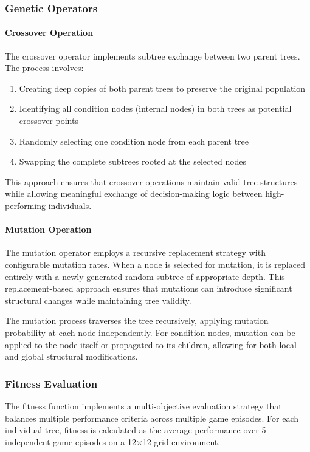 \documentclass[a4paper,12pt]{article}
\begin{document}
\subsubsection{Genetic Operators}

\paragraph{Crossover Operation} The crossover operator implements subtree exchange between two parent trees. The process involves:
\begin{enumerate}
   \item Creating deep copies of both parent trees to preserve the original population
   \item Identifying all condition nodes (internal nodes) in both trees as potential crossover points
   \item Randomly selecting one condition node from each parent tree
   \item Swapping the complete subtrees rooted at the selected nodes
\end{enumerate}

This approach ensures that crossover operations maintain valid tree structures while allowing meaningful exchange of decision-making logic between high-performing individuals.

\paragraph{Mutation Operation} The mutation operator employs a recursive replacement strategy with configurable mutation rates. When a node is selected for mutation, it is replaced entirely with a newly generated random subtree of appropriate depth. This replacement-based approach ensures that mutations can introduce significant structural changes while maintaining tree validity.

The mutation process traverses the tree recursively, applying mutation probability at each node independently. For condition nodes, mutation can be applied to the node itself or propagated to its children, allowing for both local and global structural modifications.

\subsubsection{Fitness Evaluation}

The fitness function implements a multi-objective evaluation strategy that balances multiple performance criteria across multiple game episodes. For each individual tree, fitness is calculated as the average performance over 5 independent game episodes on a 12×12 grid environment.
\end{document}
